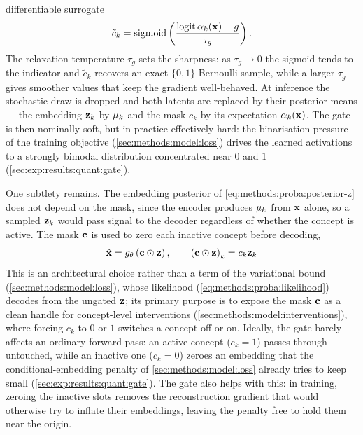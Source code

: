 differentiable surrogate
\begin{equation} \label{eq:methods:proba:gumbel}
    \tilde{c}_k = \operatorname{sigmoid}\left(\frac{\operatorname{logit}\alpha_k(\vb{x}) - g}{\tau_g}\right).
\end{equation}
The relaxation temperature $\tau_g$ sets the sharpness: as $\tau_g \to 0$ the
sigmoid tends to the indicator and $\tilde{c}_k$ recovers an exact $\{0, 1\}$
Bernoulli sample, while a larger $\tau_g$ gives smoother values that keep the
gradient well-behaved. At inference the stochastic draw is dropped and both
latents are replaced by their posterior means --- the embedding $\vb{z}_{k}$ by
$\vb{\mu}_k$ and the mask $c_{k}$ by its expectation $\alpha_k(\vb{x})$. The
gate is then nominally soft, but in practice effectively hard: the binarisation
pressure of the training objective
(\cref{sec:methods:model:loss}) drives
the learned activations to a strongly bimodal distribution concentrated near $0$
and $1$
(\cref{sec:exp:results:quant:gate}).

One subtlety remains. The embedding posterior of
\cref{eq:methods:proba:posterior-z} does not depend on the
mask, since the encoder produces $\vb{\mu}_k$ from $\vb{x}$ alone, so a sampled
$\vb{z}_k$ would pass signal to the decoder regardless of whether the concept is
active. The mask $\vb{c}$ is used to zero each inactive concept before decoding,
\begin{equation} \label{eq:methods:proba:gate}
    \hat{\vb{x}} = g_{\theta} \left(\vb{c} \odot \vb{z}\right), \qquad
    \left(\vb{c} \odot \vb{z}\right)_{k} = c_{k} \vb{z}_{k}
\end{equation}
This is an architectural choice rather than a term of the variational bound
(\cref{sec:methods:model:loss}), whose
likelihood (\cref{eq:methods:proba:likelihood}) decodes from
the ungated $\vb{z}$; its primary purpose is to expose the mask $\vb{c}$ as a
clean handle for concept-level interventions
(\cref{sec:methods:model:interventions}),
where forcing $c_k$ to $0$ or $1$ switches a concept off or on. Ideally, the
gate barely affects an ordinary forward pass: an active concept ($c_k = 1$)
passes through untouched, while an inactive one ($c_k = 0$) zeroes an embedding
that the conditional-embedding penalty of \cref{sec:methods:model:loss}
already tries to keep small
(\cref{sec:exp:results:quant:gate}).
The gate also helps with this: in training, zeroing the inactive slots removes
the reconstruction gradient that would otherwise try to inflate their
embeddings, leaving the penalty free to hold them near the origin.

